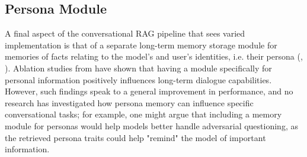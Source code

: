 \subsection{Persona Module}

A final aspect of the conversational RAG pipeline that sees varied implementation is that of a separate long-term memory storage module for memories of facts relating to the model's and user's identities, i.e. their persona (\cite{Zhong2023}, \cite{Li2024}). Ablation studies from \cite{Li2024} have shown that having a module specifically for personal information positively influences long-term dialogue capabilities. However, such findings speak to a general improvement in performance, and no research has investigated how persona memory can influence specific conversational tasks; for example, one might argue that including a memory module for personas would help models better handle adversarial questioning, as the retrieved persona traits could help "remind" the model of important information.

 